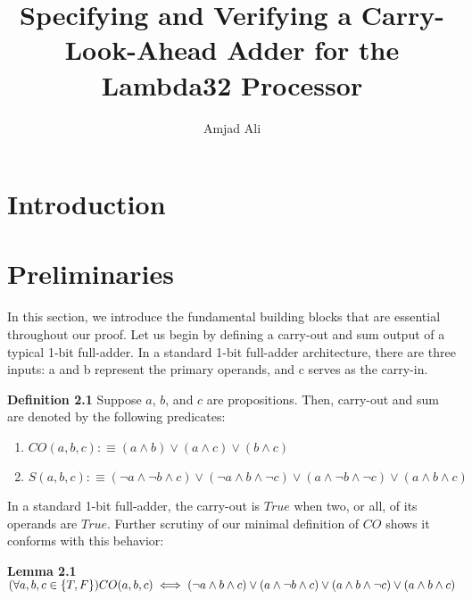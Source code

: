 \documentclass{article}
\title{Specifying and Verifying a Carry-Look-Ahead Adder for the Lambda32 Processor}
\author{Amjad Ali}
\begin{document}
\maketitle

\begin{abstract}
\lipsum[1]
\end{abstract}

\section{Introduction}
\lipsum[1-2] 

\section{Preliminaries}
In this section, we introduce the fundamental building blocks that are essential throughout our proof. Let us begin by defining a carry-out and sum output of a typical 1-bit full-adder. In a standard 1-bit full-adder architecture, there are three inputs: a and b represent the primary operands, and c serves as the carry-in.

\noindent \textbf{Definition 2.1} Suppose $a$, $b$, and $c$ are propositions. Then, carry-out and sum are denoted by the following predicates:

\begin{enumerate}
	\item $CO(a, b, c) :\equiv (a \land b) \lor (a \land c) \lor (b \land c)$
	\item $S(a, b, c) :\equiv (\lnot a \land \lnot b \land c) \lor (\lnot a \land b \land \lnot c) \lor (a \land \lnot b \land \lnot c) \lor (a \land b \land c)$
\end{enumerate}

In a standard 1-bit full-adder, the carry-out is  $True$ when two, or all, of its operands are $True$. Further scrutiny of our minimal definition of $CO$ shows it conforms with this behavior:

\noindent \textbf{Lemma 2.1}  $ (\forall a, b, c \in \{T, F\})CO(a, b, c) \iff  (\lnot a \land b \land c) \lor (a \land \lnot b \land c) \lor \\ (a \land b \land \lnot c) \lor  (a \land b \land c)$ 
\end{document}
